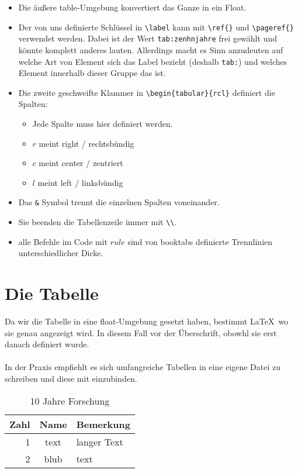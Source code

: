 \documentclass{scrartcl}
\begin{document}
\begin{itemize}
	\item Die äußere table-Umgebung konvertiert das Ganze in ein Float.
	\item Der von uns definierte Schlüssel in \verb|\label| kann mit \verb|\ref{}| und \verb|\pageref{}| verwendet werden. Dabei ist der Wert \verb|tab:zenhnjahre| frei gewählt und könnte komplett anderes lauten. Allerdings macht es Sinn anzudeuten auf welche Art von Element sich das Label bezieht (deshalb \verb|tab:|) und welches Element innerhalb dieser Gruppe das ist. 
	\item Die zweite geschweifte Klammer in \verb|\begin{tabular}{rcl}| definiert die Spalten:
	\begin{itemize}
		\item Jede Spalte muss hier definiert werden.
		\item $r$ meint right / rechtsbündig
		\item $c$ meint center / zentriert
		\item $l$ meint left / linksbündig
	\end{itemize}
	\item Das \verb|&| Symbol trennt die einzelnen Spalten voneinander.
	\item Sie beenden die Tabellenzeile immer mit \verb|\\|.
	\item alle Befehle im Code mit $rule$ sind von booktabs definierte Trennlinien unterschiedlicher Dicke.
\end{itemize}

\section{Die Tabelle}

Da wir die Tabelle in eine float-Umgebung gesetzt haben, bestimmt \LaTeX\ wo sie genau angezeigt wird. In diesem Fall vor der Überschrift, obowhl sie erst danach definiert wurde.\\
\\
In der Praxis empfiehlt es sich umfangreiche Tabellen in eine eigene Datei zu schreiben und diese mit \verb|| einzubinden.

\begin{table}
\centering
\begin{tabular}{rcl}
\toprule
Zahl & Name & Bemerkung\\
\midrule
1 & text & langer Text\\
2 & blub & text\\
\end{tabular}

\caption{10 Jahre Forschung}
\label{tab:zehnjahre}
\end{table}
\end{document}
